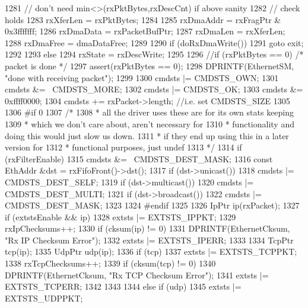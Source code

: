 \begin{DoxyCode}
{{{1281             // don't need min<>(rxPktBytes,rxDescCnt) if above sanity
1282             // check holds
1283             rxXferLen = rxPktBytes;
1284 
1285             rxDmaAddr = rxFragPtr & 0x3fffffff;
1286             rxDmaData = rxPacketBufPtr;
1287             rxDmaLen = rxXferLen;
1288             rxDmaFree = dmaDataFree;
1289 
1290             if (doRxDmaWrite())
1291                 goto exit;
1292 
1293         } else {
1294             rxState = rxDescWrite;
1295 
1296             //if (rxPktBytes == 0) {  /* packet is done */
1297             assert(rxPktBytes == 0);
1298             DPRINTF(EthernetSM, "done with receiving packet\n");
1299 
1300             cmdsts |= CMDSTS_OWN;
1301             cmdsts &= ~CMDSTS_MORE;
1302             cmdsts |= CMDSTS_OK;
1303             cmdsts &= 0xffff0000;
1304             cmdsts += rxPacket->length;   //i.e. set CMDSTS_SIZE
1305 
1306 #if 0
1307             /*
1308              * all the driver uses these are for its own stats keeping
1309              * which we don't care about, aren't necessary for
1310              * functionality and doing this would just slow us down.
1311              * if they end up using this in a later version for
1312              * functional purposes, just undef
1313              */
1314             if (rxFilterEnable) {
1315                 cmdsts &= ~CMDSTS_DEST_MASK;
1316                 const EthAddr &dst = rxFifoFront()->dst();
1317                 if (dst->unicast())
1318                     cmdsts |= CMDSTS_DEST_SELF;
1319                 if (dst->multicast())
1320                     cmdsts |= CMDSTS_DEST_MULTI;
1321                 if (dst->broadcast())
1322                     cmdsts |= CMDSTS_DEST_MASK;
1323             }
1324 #endif
1325 
1326             IpPtr ip(rxPacket);
1327             if (extstsEnable && ip) {
1328                 extsts |= EXTSTS_IPPKT;
1329                 rxIpChecksums++;
1330                 if (cksum(ip) != 0) {
1331                     DPRINTF(EthernetCksum, "Rx IP Checksum Error\n");
1332                     extsts |= EXTSTS_IPERR;
1333                 }
1334                 TcpPtr tcp(ip);
1335                 UdpPtr udp(ip);
1336                 if (tcp) {
1337                     extsts |= EXTSTS_TCPPKT;
1338                     rxTcpChecksums++;
1339                     if (cksum(tcp) != 0) {
1340                         DPRINTF(EthernetCksum, "Rx TCP Checksum Error\n");
1341                         extsts |= EXTSTS_TCPERR;
1342 
1343                     }
1344                 } else if (udp) {
1345                     extsts |= EXTSTS_UDPPKT;
}}}}}}
\end{DoxyCode}
